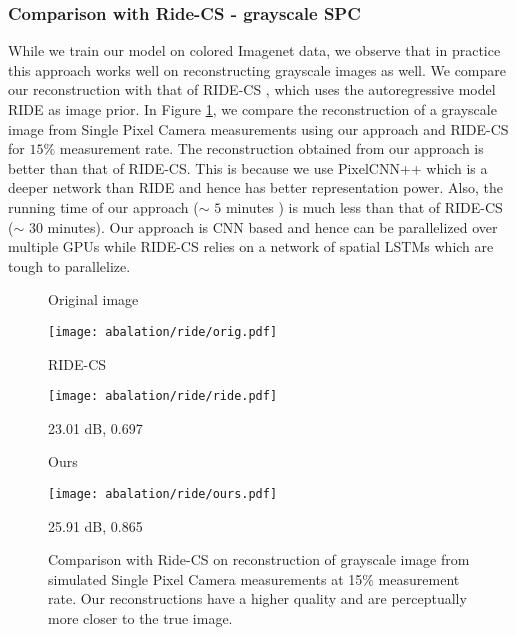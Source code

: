 \documentclass[journal,twoside]{IEEEtran}
\begin{document}
\subsubsection{Comparison with Ride-CS - grayscale SPC}
While we train our model on colored Imagenet data, we observe that in practice this approach works well on reconstructing grayscale images as well. We compare our reconstruction with that of RIDE-CS \cite{dave2017compressive}, which uses the autoregressive model RIDE \cite{theis2015generative} as image prior. In Figure \ref{fig:abalation_ride}, we compare the reconstruction of a grayscale image from Single Pixel Camera measurements using our approach and RIDE-CS for $15\%$ measurement rate. The reconstruction obtained from our approach is better than that of RIDE-CS. This is because we use PixelCNN++ which is a deeper network than RIDE and hence has better representation power.  Also, the running time of our approach ($\sim$ $5$ minutes ) is much less than that of RIDE-CS ($\sim$ $30$ minutes). Our approach is CNN based and hence can be parallelized over multiple GPUs while RIDE-CS relies on a network of spatial LSTMs which are tough to parallelize. 

\begin{figure}[!h]
    \centering
\begin{minipage}{0.5\textwidth}
\centering
\begin{minipage}{.30\textwidth}
\centerline{Original image}
\vspace{0.01cm}
\texttt{[image: abalation/ride/orig.pdf]}  
\centerline{}
\end{minipage}\hspace{0.1cm}
\begin{minipage}{.30\textwidth}
\centerline{RIDE-CS}
\vspace{0.1cm}
\texttt{[image: abalation/ride/ride.pdf]}  
  
\centerline{ 23.01 dB, 0.697}
\end{minipage}\hspace{0.1cm}
\begin{minipage}{.30\textwidth}
\centerline{Ours}
\vspace{0.1cm}
\texttt{[image: abalation/ride/ours.pdf]}

\centerline{ 25.91 dB, 0.865}
\end{minipage}\hspace{0.1cm}
\end{minipage}

    \caption{Comparison with Ride-CS on reconstruction of grayscale image from simulated Single Pixel Camera measurements at 15\% measurement rate. Our reconstructions have a higher quality and are perceptually more closer to the true image.}
    \label{fig:abalation_ride}
\end{figure}
\end{document}

